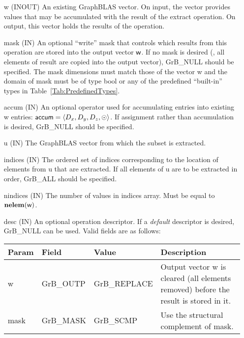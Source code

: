 \begin{itemize}[leftmargin=1in]
    \item[{\sf w}]    ({\sf INOUT}) An existing GraphBLAS vector.  On input,
    the vector provides values that may be accumulated with the result of the
    extract operation.  On output, this vector holds the results of the
    operation.

    \item[{\sf mask}]  ({\sf IN}) An optional ``write'' mask that controls which
    results from this operation are stored into the output vector
    ${\sf w}$.  If no mask is desired (\ie, all elements
    of result are copied into the output vector), {\sf GrB\_NULL}
    should be specified. The mask dimensions must match those of the
    vector {\sf w} and the domain of {\sf mask} must be
    of type {\sf bool} or any of the predefined ``built-in'' types in
    Table~\ref{Tab:PredefinedTypes}.


    \item[{\sf accum}]    ({\sf IN}) An optional operator used for accumulating
    entries into existing {\sf w} entries: ${\sf accum} = \langle D_x,
    D_y, D_z,\odot \rangle$. If assignment rather than accumulation is
    desired, {\sf GrB\_NULL} should be specified.

    \item[{\sf u}]       ({\sf IN}) The GraphBLAS vector from which the subset
    is extracted.
    
    \item[{\sf indices}]  ({\sf IN}) The ordered set of indices corresponding to the 
    location of elements from {\sf u} that are extracted.  If all elements of
    {\sf u} are to be extracted in order, {\sf GrB\_ALL} should be specified.
    
    \item[{\sf nindices}] ({\sf IN}) The number of values in {\sf indices} array.
    Must be equal to $\bold{nelem}({\sf w})$.

    \item[{\sf desc}]     ({\sf IN}) An optional operation descriptor.  If a 
    \emph{default} descriptor is desired, {\sf GrB\_NULL} can be used.  Valid 
    fields are as follows: \\
    
    \begin{tabular}{lllp{2.5in}}
        Param & Field  & Value & Description \\
        \hline
        {\sf w}    & {\sf GrB\_OUTP} & {\sf GrB\_REPLACE} & Output vector {\sf w}
        is cleared (all elements removed) before the result is stored in it. \\
        
        {\sf mask} & {\sf GrB\_MASK} & {\sf GrB\_SCMP}   & Use the structural 
        complement of {\sf mask}. \\
    \end{tabular}
\end{itemize}

